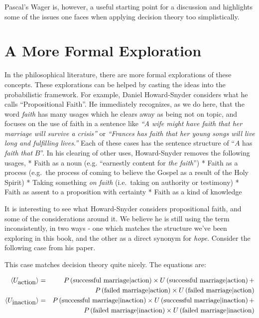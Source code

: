 \documentclass{tufte-book}
\begin{document}
Pascal's Wager is, however, a useful starting point for a discussion and
highlights some of the issues one faces when applying decision theory
too simplistically.

\section{A More Formal Exploration}\label{a-more-formal-exploration}

In the philosophical literature, there are more formal explorations of
these concepts. These explorations can be helped by casting the ideas
into the probabilistic framework. For example, Daniel Howard-Snyder
considers what he calls ``Propositional
Faith''\citep{howard2013propositional}. He immediately recognizes, as we
do here, that the word \emph{faith} has many usages which he clears away
as being not on topic, and focuses on the use of faith in a sentence
like \emph{``A wife might have faith that her marriage will survive a
crisis''} or \emph{``Frances has faith that her young songs will live
long and fulfilling lives.''} Each of these cases has the sentence
structure of ``\(A\) has \emph{faith that} \(B\)''. In his clearing of
other uses, Howard-Snyder removes the following usages, * Faith as a
noun (e.g. ``earnestly content for \emph{the faith}'') * Faith as a
process (e.g.~the process of coming to believe the Gospel as a result of
the Holy Spirit) * Taking something \emph{on faith} (i.e.~taking on
authority or testimony) * Faith as assent to a proposition with
certainty * Faith as a kind of knowledge

It is interesting to see what Howard-Snyder considers propositional
faith, and some of the considerations around it. We believe he is still
using the term inconsistently, in two ways - one which matches the
structure we've been exploring in this book, and the other as a direct
synonym for \emph{hope}. Consider the following case from his paper.

This case matches decision theory quite nicely. The equations are:

\begin{eqnarray*}
\langle U_{\mbox{action}}\rangle &=& P\left(\mbox{successful marriage}|\mbox{action}\right)\times U\left(\mbox{successful marriage}|\mbox{action}\right) + \\
&& P\left(\mbox{failed marriage}|\mbox{action}\right)\times U\left(\mbox{failed marriage}|\mbox{action}\right) \\
\langle U_{\mbox{inaction}}\rangle &=& P\left(\mbox{successful marriage}|\mbox{inaction}\right)\times U\left(\mbox{successful marriage}|\mbox{inaction}\right) + \\
&& P\left(\mbox{failed marriage}|\mbox{inaction}\right)\times U\left(\mbox{failed marriage}|\mbox{inaction}\right)
\end{eqnarray*}
\end{document}
